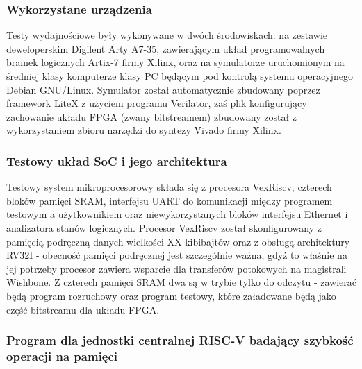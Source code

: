 \subsubsection{Wykorzystane urządzenia}

Testy wydajnościowe były wykonywane w dwóch środowiskach: na zestawie deweloperskim Digilent Arty A7-35, zawierającym układ programowalnych bramek logicznych Artix-7 firmy Xilinx, oraz na symulatorze uruchomionym na średniej klasy komputerze klasy PC będącym pod kontrolą systemu operacyjnego Debian GNU/Linux. Symulator został automatycznie zbudowany poprzez framework LiteX z użyciem programu Verilator, zaś plik konfigurujący zachowanie układu FPGA (zwany bitstreamem) zbudowany został z wykorzystaniem zbioru narzędzi do syntezy Vivado firmy Xilinx.


\subsubsection{Testowy układ SoC i jego architektura}

Testowy system mikroprocesorowy składa się z procesora VexRiscv, czterech bloków pamięci SRAM, interfejsu UART do komunikacji między programem testowym a użytkownikiem oraz niewykorzystanych bloków interfejsu Ethernet i analizatora stanów logicznych.
Procesor VexRiscv został skonfigurowany z pamięcią podręczną danych wielkości XX kibibajtów oraz z obsługą architektury RV32I - obecność pamięci podręcznej jest szczególnie ważna, gdyż to właśnie na jej potrzeby procesor zawiera wsparcie dla transferów potokowych na magistrali Wishbone.
Z czterech pamięci SRAM dwa są w trybie tylko do odczytu - zawierać będą program rozruchowy oraz program testowy, które załadowane będą jako część bitstreamu dla układu FPGA.


\subsubsection{Program dla jednostki centralnej RISC-V badający szybkość operacji na pamięci}

